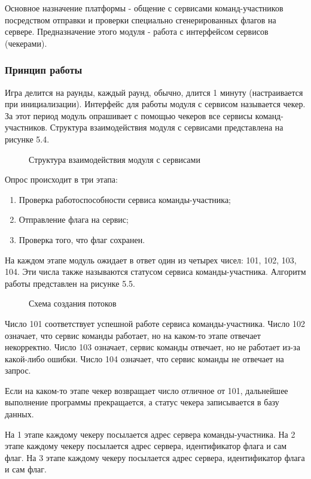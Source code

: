 Основное назначение платформы - общение с сервисами команд-участников посредством отправки и проверки специально сгенерированных флагов на сервере. Предназначение этого модуля - работа с интерфейсом сервисов (чекерами).

\subsubsection{Принцип работы}
Игра делится на раунды, каждый раунд, обычно, длится 1 минуту (настраивается при инициализации). Интерфейс для работы модуля с сервисом называется чекер. За этот период модуль опрашивает с помощью чекеров все сервисы команд-участников. Структура взаимодействия модуля с сервисами представлена на рисунке 5.4.

\begin{figure}[ht!]
\caption{Структура взаимодействия модуля с сервисами}
\end{figure}

Опрос происходит в три этапа:
\begin{enumerate} 
\item Проверка работоспособности сервиса команды-участника;
\item Отправление флага на сервис; 
\item Проверка того, что флаг сохранен.
\end{enumerate}

На каждом этапе модуль ожидает в ответ один из четырех чисел: 101, 102, 103, 104. Эти числа также называются статусом сервиса команды-участника. Алгоритм работы представлен на рисунке 5.5.

\begin{figure}[ht!]
\caption{Схема создания потоков}
\end{figure}


Число 101 соответствует успешной работе сервиса команды-участника. Число 102 означает, что сервис команды работает, но на каком-то этапе отвечает некорректно. Число 103 означает, сервис команды отвечает, но не работает из-за какой-либо ошибки. Число 104 означает, что сервис команды не отвечает на запрос. 

Если на каком-то этапе чекер возвращает число отличное от 101, дальнейшее выполнение программы прекращается, а статус чекера записывается в базу данных.

На 1 этапе каждому чекеру посылается адрес сервера команды-участника. 
На 2 этапе каждому чекеру посылается адрес сервера, идентификатор флага и сам флаг. 
На 3 этапе каждому чекеру посылается адрес сервера, идентификатор флага и сам флаг.

